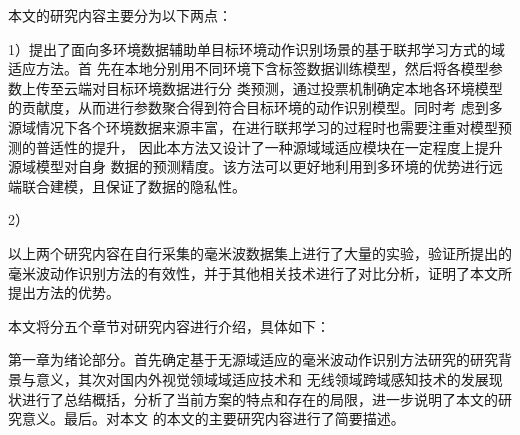 本文的研究内容主要分为以下两点：

1）提出了面向多环境数据辅助单目标环境动作识别场景的基于联邦学习方式的域适应方法。首
先在本地分别用不同环境下含标签数据训练模型，然后将各模型参数上传至云端对目标环境数据进行分
类预测，通过投票机制确定本地各环境模型的贡献度，从而进行参数聚合得到符合目标环境的动作识别模型。同时考
虑到多源域情况下各个环境数据来源丰富，在进行联邦学习的过程时也需要注重对模型预测的普适性的提升，
因此本方法又设计了一种源域域适应模块在一定程度上提升源域模型对自身
数据的预测精度。该方法可以更好地利用到多环境的优势进行远端联合建模，且保证了数据的隐私性。

2）

以上两个研究内容在自行采集的毫米波数据集上进行了大量的实验，验证所提出的毫米波动作识别方法的有效性，并于其他相关技术进行了对比分析，证明了本文所提出方法的优势。


本文将分五个章节对研究内容进行介绍，具体如下：

第一章为绪论部分。首先确定基于无源域适应的毫米波动作识别方法研究的研究背景与意义，其次对国内外视觉领域域适应技术和
无线领域跨域感知技术的发展现状进行了总结概括，分析了当前方案的特点和存在的局限，进一步说明了本文的研究意义。最后。对本文
的本文的主要研究内容进行了简要描述。

